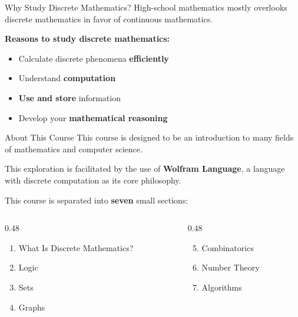 \documentclass[aspectratio=169,11pt]{beamer}
\begin{document}
\begin{frame}{Why Study Discrete Mathematics?}
  High-school mathematics mostly overlooks discrete mathematics
  in favor of continuous mathematics.

  \medskip
  \textbf{Reasons to study discrete mathematics:}

  \begin{itemize}
    \setlength\itemsep{0.4em}
    \item Calculate discrete phenomena \textbf{efficiently}
    \item Understand \textbf{computation}
    \item \textbf{Use and store} information
    \item Develop your \textbf{mathematical reasoning}
  \end{itemize}
\end{frame}

\begin{frame}{About This Course}
  This course is designed to be an introduction to many fields of
  mathematics and computer science.

  \medskip
  This exploration is facilitated by the use of
  \textbf{Wolfram Language}, a language with discrete computation
  as its core philosophy.

  \medskip
  This course is separated into \textbf{seven} small sections:

  \begin{columns}[T]
    \begin{column}{0.48\textwidth}
      \begin{enumerate}
        \item What Is Discrete Mathematics?
        \item Logic
        \item Sets
        \item Graphs
      \end{enumerate}
    \end{column}
    \begin{column}{0.48\textwidth}
      \begin{enumerate}
        \setcounter{enumi}{4}
        \item Combinatorics
        \item Number Theory
        \item Algorithms
      \end{enumerate}
    \end{column}
  \end{columns}
\end{frame}
\end{document}
